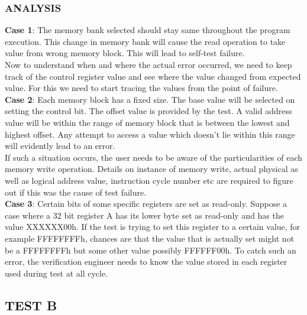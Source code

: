\subsubsection{ANALYSIS}
{\bf Case 1}: The memory bank selected should stay same throughout the program execution. This change in memory bank will cause the read operation to take value from wrong memory block. This will lead to self-test failure. \\
 Now to understand when and where the actual error occurred, we need to keep track of the control register value and see where the value changed from expected value. For this we need to start tracing the values from the point of failure. \\
{\bf Case 2}: Each memory block has a fixed size. The base value will be selected on setting the control bit. The offset value is provided by the test. A valid address value will be within the range of memory block that is between the lowest and highest offset. Any attempt to access a value which doesn't lie within this range will evidently lead to an error.\\
If such a situation occurs, the user needs to be aware of the particularities of each memory write operation. Details on instance of memory write, actual physical as well as logical address value, instruction cycle number etc are required to figure out if this was the cause of test failure.\\
{\bf Case 3}: Certain bits of some specific registers are set as read-only. Suppose a case where a 32 bit register A has its lower byte set as read-only and has the value XXXXXX00h. If the test is trying to set this register to a certain value, for example FFFFFFFFh, chances are that the value that is actually set might not be a FFFFFFFFh but some other value possibly FFFFFF00h. 
To catch such an error, the verification engineer needs to know the value stored in each register used during test at all cycle.



\subsection {TEST B}



